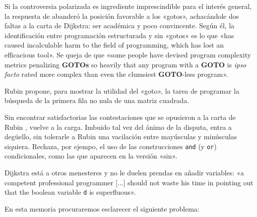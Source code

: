 Si la controversia polarizada es ingrediente imprescindible
para el interés general, la respuesta de \citet{1987_Rubin}
abanderó la posición favorable a los «gotos», achacándole
dos faltas a la carta de Dijkstra: ser académica y poco
convincente. Según él, la identificación entre programación
estructurada y sin «gotos» es lo que «has caused
incalculable harm to the field of programming, which has
lost an efficacious tool». Se queja de que «some people have
devised program complexity metrics penalizing \textbf{GOTOs}
so heavily that any program with a \textbf{GOTO} is
\emph{ipso facto} rated more complex than even the clumsiest
\textbf{GOTO}-less program».

Rubin propone, para mostrar la utilidad del «goto», la tarea
de programar la búsqueda de la primera fila no nula de una
matriz cuadrada.

\hfill
{}

%

Sin encontrar satisfactorias las contestaciones que se
opusieron a la carta de Rubin \citep{1987_Moore},
\citet{1987_Dijkstra} vuelve a la carga. Imbuido tal vez del
ánimo de la dispu\-ta, entra a degüello, sin tolerarle a
Rubin una vacilación entre mayúsculas y minúsculas
siquiera. Rechaza, por ejempo, el uso de las construcciones
{\tt and} (y {\tt or}) condicionales, como las que aparecen
en la versión «sin».

Dijkstra está a otros menesteres y no le duelen prendas en
añadir variables: «a competent professional programmer [...]
should not waste his time in pointing out that the boolean
variable \texttt{d} is superfluous».

\begin{center}
\end{center}

En esta memoria procuraremos esclarecer el siguiente problema:

\begin{tcolorbox}
\lipsum[11]
\end{tcolorbox}
